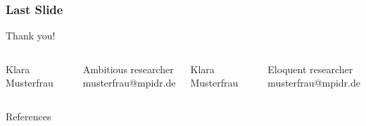 \documentclass[aspectratio=169]{beamer}
\begin{document}
\begin{frame}[mpidrbackground=5]
    \frametitle{Last Slide}
    
    Thank you!
    
    \vspace{0.8cm}
    
    \begin{columns}
          
            Klara Musterfrau\\ \vspace{0.3cm}
            
            Ambitious researcher\\ \vspace{0.15cm}
            musterfrau@mpidr.de
    
             
            Klara Musterfrau\\ \vspace{0.3cm}
            
            Eloquent researcher\\ \vspace{0.15cm}
            musterfrau@mpidr.de
             
       \end{columns}

\end{frame}

\begin{frame}{References}
    
    
\end{frame}
\end{document}
